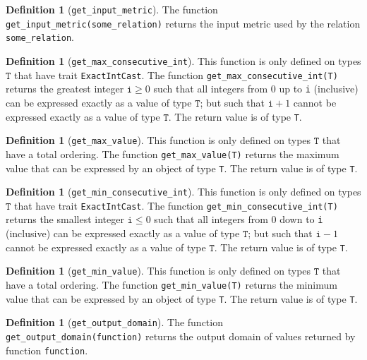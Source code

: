 \documentclass[11pt,a4paper]{article}
\theoremstyle{definition}
\newtheorem{definition}[theorem]{Definition}
\newcommand{\T}{\texttt{T}}
\begin{document}
\begin{definition}[\texttt{get\_input\_metric}]
    The function \texttt{get\_input\_metric(some\_relation)} returns the input metric used by the relation \texttt{some\_relation}.
\end{definition}

\begin{definition}[\texttt{get\_max\_consecutive\_int}]
    This function is only defined on types $\T$ that have trait \texttt{ExactIntCast}. The function \texttt{get\_max\_consecutive\_int(T)} returns the greatest integer $\texttt{i}\geq 0$ such that all integers from 0 up to \texttt{i} (inclusive) can be expressed exactly as a value of type $\T$; but such that $\texttt{i}+1$ cannot be expressed exactly as a value of type $\T$. The return value is of type \texttt{T}.
\end{definition}

\begin{definition}[\texttt{get\_max\_value}]
    This function is only defined on types $\T$ that have a total ordering. The function \texttt{get\_max\_value(T)} returns the maximum value that can be expressed by an object of type \texttt{T}. The return value is of type \texttt{T}.
\end{definition}

\begin{definition}[\texttt{get\_min\_consecutive\_int}]
    This function is only defined on types $\T$ that have trait \texttt{ExactIntCast}. The function \texttt{get\_min\_consecutive\_int(T)} returns the smallest integer $\texttt{i}\leq 0$ such that all integers from 0 down to \texttt{i} (inclusive) can be expressed exactly as a value of type $\T$; but such that $\texttt{i}-1$ cannot be expressed exactly as a value of type $\T$. The return value is of type \texttt{T}.
\end{definition}

\begin{definition}[\texttt{get\_min\_value}]
    This function is only defined on types $\T$ that have a total ordering. The function \texttt{get\_min\_value(T)} returns the minimum value that can be expressed by an object of type \texttt{T}. The return value is of type \texttt{T}.
\end{definition}

\begin{definition}[\texttt{get\_output\_domain}]
    The function \texttt{get\_output\_domain(function)} returns the output domain of values returned by function \texttt{function}.
\end{definition}
\end{document}
